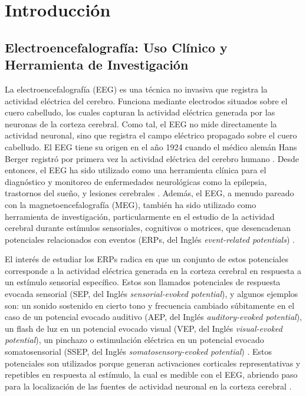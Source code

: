 %
\chapter{Introducción}
\label{sec:intro}


\section{Electroencefalografía: Uso Clínico y Herramienta de Investigación}
\label{sec:intro:eeg}

La electroencefalografía (EEG) es una técnica no invasiva que registra la actividad eléctrica del cerebro.
Funciona mediante electrodos situados sobre el cuero cabelludo, los cuales capturan la actividad eléctrica generada por las neuronas de la corteza cerebral.
Como tal, el EEG no mide directamente la actividad neuronal, sino que registra el campo eléctrico propagado sobre el cuero cabelludo.
El EEG tiene su origen en el año 1924 cuando el médico alemán Hans Berger registró por primera vez la actividad eléctrica del cerebro humano \cite{bergerUeberElektrenkephalogrammMenschen1929}.
Desde entonces, el EEG ha sido utilizado como una herramienta clínica para el diagnóstico y monitoreo de enfermedades neurológicas como la epilepsia, trastornos del sueño, y lesiones cerebrales \cite{niedermeyerElectroencephalographyBasicPrinciples2005}.
Además, el EEG, a menudo pareado con la magnetoencefalografía (MEG), también ha sido utilizado como herramienta de investigación, particularmente en el estudio de la actividad cerebral durante estímulos sensoriales, cognitivos o motrices, que desencadenan potenciales relacionados con eventos (ERPs, del Inglés \emph{event-related potentials}) \cite{luckIntroductionEventrelatedPotential2014}.

El interés de estudiar los ERPs radica en que un conjunto de estos potenciales corresponde a la actividad eléctrica generada en la corteza cerebral en respuesta a un estímulo sensorial específico.
Estos son llamados potenciales de respuesta evocada sensorial (SEP, del Inglés \emph{sensorial-evoked potential}), y algunos ejemplos son: un sonido sostenido en cierto tono y frecuencia cambiado súbitamente en el caso de un potencial evocado auditivo (AEP, del Inglés \emph{auditory-evoked potential}), un flash de luz en un potencial evocado visual (VEP, del Inglés \emph{visual-evoked potential}), un pinchazo o estimulación eléctrica en un potencial evocado somatosensorial (SSEP, del Inglés \emph{somatosensory-evoked potential}) \cite{kreutzerEncyclopediaClinicalNeuropsychology2011}.
Estos potenciales son utilizados porque generan activaciones corticales representativas y repetibles en respuesta al estímulo, la cual es medible con el EEG, abriendo paso para la localización de las fuentes de actividad neuronal en la corteza cerebral \cite{luckIntroductionEventrelatedPotential2014}.

